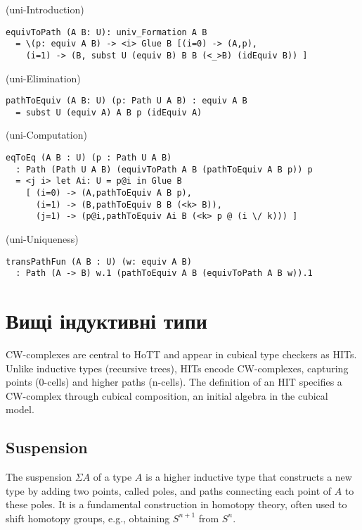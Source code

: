 \begin{definition} (uni-Introduction)
\begin{lstlisting}
equivToPath (A B: U): univ_Formation A B
  = \(p: equiv A B) -> <i> Glue B [(i=0) -> (A,p),
    (i=1) -> (B, subst U (equiv B) B B (<_>B) (idEquiv B)) ]
\end{lstlisting}
\end{definition}

\begin{definition} (uni-Elimination)
\begin{lstlisting}
pathToEquiv (A B: U) (p: Path U A B) : equiv A B
  = subst U (equiv A) A B p (idEquiv A)
\end{lstlisting}
\end{definition}

\begin{definition} (uni-Computation)
\begin{lstlisting}
eqToEq (A B : U) (p : Path U A B)
  : Path (Path U A B) (equivToPath A B (pathToEquiv A B p)) p
  = <j i> let Ai: U = p@i in Glue B
    [ (i=0) -> (A,pathToEquiv A B p),
      (i=1) -> (B,pathToEquiv B B (<k> B)),
      (j=1) -> (p@i,pathToEquiv Ai B (<k> p @ (i \/ k))) ]

\end{lstlisting}
\end{definition}

\begin{definition} (uni-Uniqueness)
\begin{lstlisting}
transPathFun (A B : U) (w: equiv A B)
  : Path (A -> B) w.1 (pathToEquiv A B (equivToPath A B w)).1
\end{lstlisting}
\end{definition}

\section{Вищі індуктивні типи}

CW-complexes are central to HoTT and appear in cubical type checkers as HITs.
Unlike inductive types (recursive trees), HITs encode CW-complexes, capturing
points (0-cells) and higher paths (n-cells). The definition of an HIT specifies a CW-complex
through cubical composition, an initial algebra in the cubical model.

\newpage
\subsection{Suspension}
The suspension \(\Sigma A\) of a type \( A \) is a higher inductive type that
constructs a new type by adding two points, called poles, and paths connecting
each point of \( A \) to these poles. It is a fundamental construction in homotopy theory,
often used to shift homotopy groups, e.g., obtaining \( S^{n+1} \) from \( S^n \).

